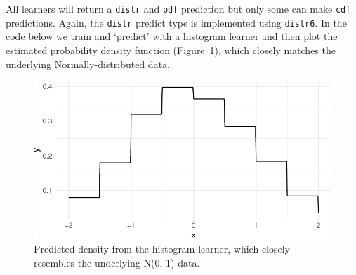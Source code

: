 All learners will return a \texttt{distr} and \texttt{pdf} prediction
but only some can make \texttt{cdf} predictions. Again, the
\texttt{distr} predict type is implemented using \texttt{distr6}. In the
code below we train and `predict' with a histogram learner and then plot
the estimated probability density function (Figure~\ref{fig-dens-hist}),
which closely matches the underlying Normally-distributed data.

\begin{Shaded}
\begin{Highlighting}[]
\OtherTok{=} \NormalTok{(}\NormalTok{)}
\OtherTok{=}\SpecialCharTok{$}\SpecialCharTok{:}\NormalTok{)}\SpecialCharTok{$}\SpecialCharTok{:}\NormalTok{)}
\OtherTok{=} \NormalTok{(}\SpecialCharTok{{-}}\NormalTok{, }\NormalTok{, }\NormalTok{)}
\OtherTok{=} \NormalTok{(}\SpecialCharTok{$}\SpecialCharTok{$}
\NormalTok{(}\SpecialCharTok{+} \NormalTok{() }\SpecialCharTok{+} \NormalTok{()}
\end{Highlighting}
\end{Shaded}

\begin{figure}[H]

{\centering \includegraphics[width=1\textwidth,height=\textheight]{chapters/chapter13/beyond_regression_and_classification_files/figure-pdf/fig-dens-hist-1.pdf}

}

\caption{\label{fig-dens-hist}Predicted density from the histogram
learner, which closely resembles the underlying N(0, 1) data.}

\end{figure}


